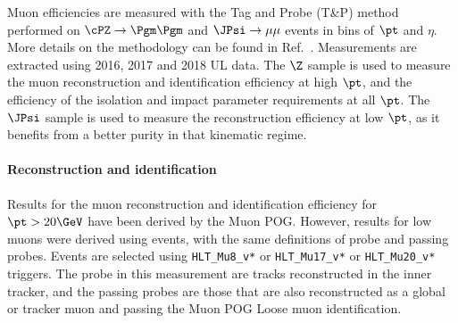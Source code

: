 
Muon efficiencies are measured with the Tag and Probe (T\&P) method performed on
$\cPZ \to \Pgm\Pgm$ and $\JPsi\to\mu\mu$ events in bins of $\pt$ and $\eta$. More
details on the methodology can be found in Ref.~\cite{CMS_AN_2015-277}. Measurements are extracted using 2016, 2017 and 2018 UL data.
%
The $\Z$ sample is used to measure the muon reconstruction and identification efficiency at high $\pt$,
and the efficiency of the isolation and impact parameter requirements at all $\pt$.
%
The $\JPsi$ sample is used to measure the reconstruction efficiency at low $\pt$,
as it benefits from a better purity in that kinematic regime. 

\paragraph*{Reconstruction and identification}

Results for the muon reconstruction and identification efficiency for $\pt > 20\GeV$
have been derived by the Muon POG.
However, results for low \pt muons were derived using \JPsi events, with the same definitions of probe and passing probes. Events are selected using \verb=HLT_Mu8_v*= or \verb=HLT_Mu17_v*= or \verb=HLT_Mu20_v*= triggers. The probe in this measurement are tracks reconstructed in the inner tracker, and
the passing probes are those that are also reconstructed as a global or tracker muon 
and passing the Muon POG Loose muon identification.
%


